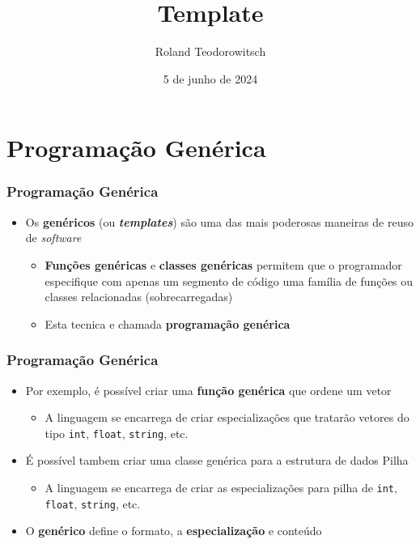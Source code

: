 \documentclass[aspectratio=169]{beamer}
\title[\sc{Template}]{Template}
\author[Roland Teodorowitsch]{Roland Teodorowitsch}
\institute[POO - EC - PUCRS]{Programação Orientada a Objetos - ECo - Curso de Engenharia de Computação - PUCRS}
\date{5 de junho de 2024}
\begin{document}
\justifying

\begin{frame}
	\titlepage
\end{frame}

\section{Programação Genérica}

\begin{frame}\frametitle{Programação Genérica}
\begin{itemize}
	\item Os \textbf{genéricos} (ou \emph{\textbf{templates}}) são uma das mais poderosas maneiras de reuso de \emph{software}
	\begin{itemize}
		\item \textbf{Funções genéricas} e \textbf{classes genéricas} permitem que o programador especifique com apenas um segmento de código uma família de funções ou classes relacionadas (sobrecarregadas)
		\item Esta tecnica e chamada \textbf{programação genérica}
	\end{itemize}
\end{itemize}
\end{frame}

\begin{frame}\frametitle{Programação Genérica}
\begin{itemize}
	\item Por exemplo, é possível criar uma \textbf{função genérica} que ordene um vetor
	\begin{itemize}
		\item A linguagem se encarrega de criar especializações que tratarão vetores do tipo \texttt{int}, \texttt{float}, \texttt{string}, etc.
	\end{itemize}
	\item É possível tambem criar uma classe genérica para a estrutura de dados Pilha
	\begin{itemize}
		\item A linguagem se encarrega de criar as especializações para pilha de \texttt{int}, \texttt{float}, \texttt{string}, etc.
	\end{itemize}
	\item O \textbf{genérico} define o formato, a \textbf{especialização} e conteúdo
\end{itemize}
\end{frame}
\end{document}
